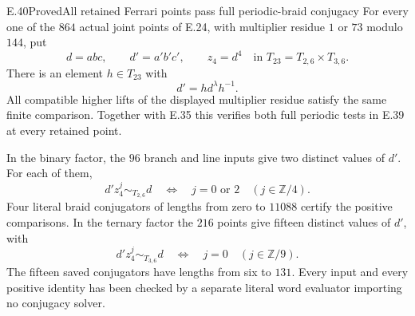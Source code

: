 \begin{statement}{E.40}{Proved}{All retained Ferrari points pass full periodic-braid conjugacy}
For every one of the $864$ actual joint points of E.24,
with multiplier residue $1$ or $73$ modulo $144$, put
\[
 d=abc,\qquad d'=a'b'c',\qquad z_4=d^4
                    \quad\text{in }T_{23}=T_{2,6}\times T_{3,6}.
 \tag{E.40.1}
\]
There is an element $h\in T_{23}$ with
\[
                           d'=hd^\lambda h^{-1}.
 \tag{E.40.2}
\]
All compatible higher lifts of the displayed multiplier
residue satisfy the same finite comparison.  Together
with E.35 this verifies both full periodic tests in
E.39 at every retained point.

In the binary factor, the $96$ branch and line inputs
give two distinct values of $d'$.  For each of them,
\[
       d'z_4^j\sim_{T_{2,6}}d
           \quad\Longleftrightarrow\quad j=0\text{ or }2
                  \quad(j\in\mathbb Z/4).
 \tag{E.40.3}
\]
Four literal braid conjugators of lengths from zero
to $11088$ certify the positive comparisons.
In the ternary factor the $216$ points give fifteen
distinct values of $d'$, with
\[
       d'z_4^j\sim_{T_{3,6}}d
           \quad\Longleftrightarrow\quad j=0
                  \quad(j\in\mathbb Z/9).
 \tag{E.40.4}
\]
The fifteen saved conjugators have lengths from
six to $131$.  Every input and every positive
identity has been checked by a separate literal
word evaluator importing no conjugacy solver.
\end{statement}
